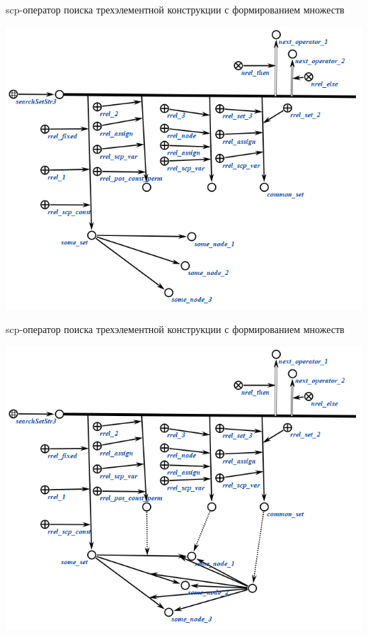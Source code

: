 \begin{frame}{scp-оператор поиска трехэлементной конструкции с формированием множеств}
	\topline
	\justifying
	\vspace{10mm}
	
	\begin{center}
		\includegraphics[scale=0.55]{figures/sd_scp/searchSetStr3_7.png}
	\end{center}
	
\end{frame}

\begin{frame}{scp-оператор поиска трехэлементной конструкции с формированием множеств}
	\topline
	\justifying
	\vspace{10mm}
	
	\begin{center}
		\includegraphics[scale=0.55]{figures/sd_scp/searchSetStr3_8.png}
	\end{center}
	
\end{frame}

